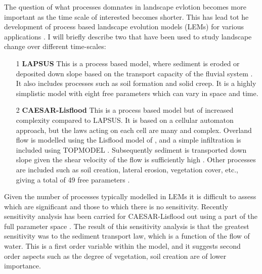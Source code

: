 The question of what processes domnates in landscape evlotion becomes more important as the time scale of interested becomes shorter. This has lead tot he development of process based landscape evolution models (LEMs) for various applications \citep[see for example][]{temme-etal-2017}. I will briefly describe two that have been used to study landscape change over different time-scales:
\begin{itemize}
\item[1] {\bf LAPSUS}
This is a process based model, where sediment is eroded or deposited down slope based on the transport capacity of the fluvial system \citep{schoorl-etal-2000}. It also includes processes such as soil formation and solid creep. It is a highly simplistic model with eight free parameters which can vary in space and time.
\item[2] {\bf CAESAR-Lisflood}
This is a process based model but of increased complexity compared to LAPSUS. It is based on a cellular automaton approach, but the laws acting on each cell are many and complex. Overland flow is modelled using the Lisflood model of \cite{bates-etal-2010}, and a simple infiltration is included using TOPMODEL \citep{beven-1979}. Subsequently sediment is transported down slope given the shear velocity of the flow is sufficiently high \citep{coulthard-etal-2013,vandeweil-etal-2007}. Other processes are included such as soil creation, lateral erosion, vegetation cover, etc., giving a total of 49 free parameters \citep{skinner-etal-2018}.
\end{itemize}
Given the number of processes typically modelled in LEMs it is difficult to assess which are significant and those to which there is no sensitivity. Recently sensitivity analysis has been carried for CAESAR-Lisflood out using a part of the full parameter space \citep{skinner-etal-2018}. The result of this sensitivity analysis is that the greatest sensitivity was to the sediment transport law, which is a function of the flow of water. This is a first order variable within the model, and it suggests second order aspects such as the degree of vegetation, soil creation are of lower importance.

